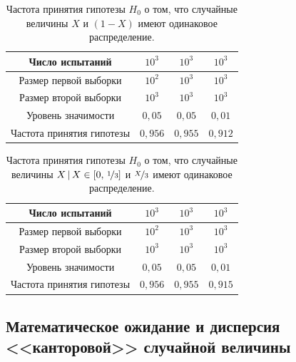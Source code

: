 \begin{table}[h!]
\begin{center}
\begin{tabular}{|c|c|c|c|}
\hline
Число испытаний
&
$10^3$&
$10^3$&
$10^3$
\\
\hline
Размер первой выборки
&
$10^2$&
$10^3$&
$10^3$
\\
\hline
Размер второй выборки
&
$10^3$&
$10^3$&
$10^3$
\\
\hline
Уровень значимости
&
$0,05$&
$0,05$&
$0,01$
\\
\hline
Частота принятия гипотезы
&
$0,956$&
$0,955$&
$0,912$
\\
\hline
\end{tabular}
\end{center}
\caption{Частота принятия гипотезы $H_0$ о том, что случайные величины $X$ и $(1 - X)$ имеют одинаковое распределение.}
\end{table}

\begin{table}[h!]
\begin{center}
\begin{tabular}{|c|c|c|c|}
\hline
Число испытаний
&
$10^3$&
$10^3$&
$10^3$
\\
\hline
Размер первой выборки
&
$10^2$&
$10^3$&
$10^3$
\\
\hline
Размер второй выборки
&
$10^3$&
$10^3$&
$10^3$
\\
\hline
Уровень значимости
&
$0,05$&
$0,05$&
$0,01$
\\
\hline
Частота принятия гипотезы
&
$0,956$&
$0,955$&
$0,915$
\\
\hline
\end{tabular}
\end{center}
\caption{Частота принятия гипотезы $H_0$ о том, что случайные величины $X\,|\,X\in[0,\,\nicefrac{1}{3}]$ и $\nicefrac{X}{3}$ имеют одинаковое распределение.}
\end{table}


\subsection{Математическое ожидание и дисперсия <<канторовой>> случайной величины}

